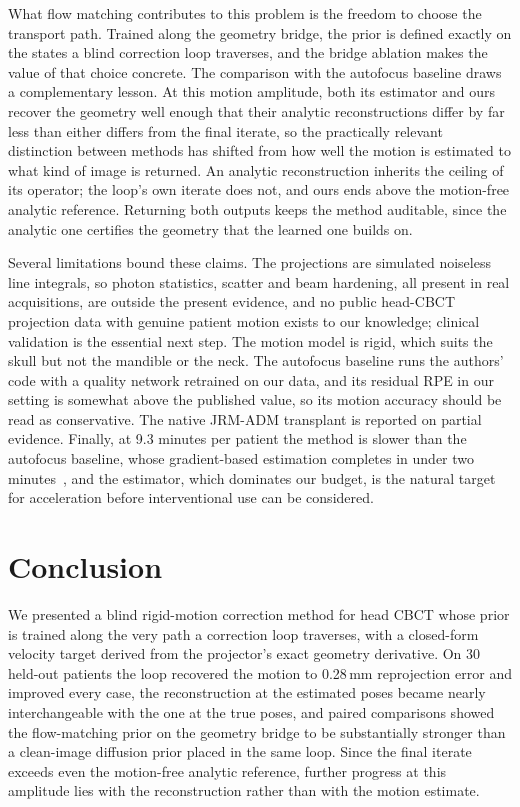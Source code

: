 \documentclass[11pt]{article}
\begin{document}
What flow matching contributes to this problem is the freedom to choose the transport
path. Trained along the geometry bridge, the prior is defined exactly on the states a
blind correction loop traverses, and the bridge ablation makes the value of that choice
concrete. The comparison with the autofocus baseline draws a complementary lesson. At this
motion amplitude, both its estimator and ours recover the geometry well enough that their
analytic reconstructions differ by far less than either differs from the final iterate,
so the practically relevant distinction between methods has shifted from how well the
motion is estimated to what kind of image is returned. An analytic reconstruction
inherits the ceiling of its operator; the loop's own iterate does not, and ours ends above
the motion-free analytic reference. Returning both outputs keeps the method auditable, since
the analytic one certifies the geometry that the learned one builds on.

Several limitations bound these claims. The projections are simulated noiseless line
integrals, so photon statistics, scatter and beam hardening, all present in real
acquisitions, are outside the present evidence, and no public head-CBCT projection data
with genuine patient motion exists to our knowledge; clinical validation is the essential
next step. The motion model is rigid, which suits the skull but not the mandible or the
neck. The autofocus baseline runs the authors' code with a quality network retrained on our
data, and its residual RPE in our setting is somewhat above the published value, so its
motion accuracy should be read as conservative. The native JRM-ADM
transplant is reported on partial evidence. Finally, at 9.3 minutes per patient the
method is slower than the autofocus baseline, whose gradient-based estimation completes
in under two minutes~\cite{thies25}, and the estimator, which dominates our budget, is
the natural target for acceleration before interventional use can be considered.

\section{Conclusion}
\label{sec:conclusion}

We presented a blind rigid-motion correction method for head CBCT whose prior is trained
along the very path a correction loop traverses, with a closed-form velocity target
derived from the projector's exact geometry derivative. On 30 held-out patients the loop
recovered the motion to 0.28\,mm reprojection error and improved every case, the
reconstruction at the estimated poses became nearly interchangeable with the one at the
true poses, and paired comparisons showed the flow-matching prior on the geometry bridge
to be substantially stronger than a clean-image diffusion prior placed in the same loop.
Since the final iterate exceeds even the motion-free analytic reference, further progress
at this amplitude lies with the reconstruction rather than with the motion estimate.
\end{document}
